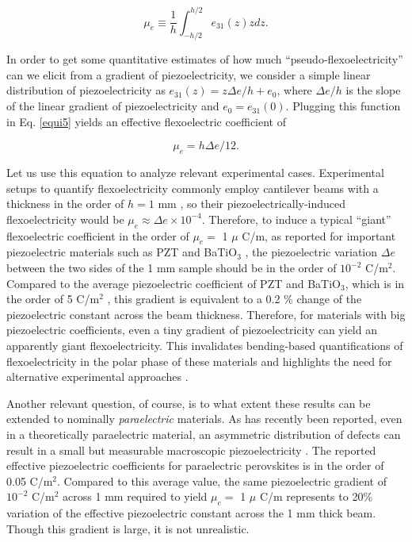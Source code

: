 \documentclass[%
 aps,prl,showpacs,
 amsmath,amssymb,
 reprint,%
]{revtex4-1}
\begin{document}
\begin{equation}
\mu_e \equiv  \frac{1}{h} \int_{-h/2}^{h/2} {e}_{31}(z) z dz. \label{equi5}
\end{equation}

In order to get some quantitative estimates of how much “pseudo-flexoelectricity” can we elicit from a gradient of piezoelectricity, we consider a simple linear distribution of piezoelectricity as
$e_{31}(z) = z {\Delta e} /h + e_0$, where $\Delta e/h$ is the slope of the linear gradient of piezoelectricity and $e_0=e_{31}(0)$. Plugging this function 
in Eq. \eqref{equi5} yields an effective flexoelectric coefficient of

\begin{equation}
\mu_e = h \Delta e/12. \label{equi6}
\end{equation}

Let us use this equation to analyze relevant experimental cases. Experimental setups to quantify flexoelectricity commonly employ cantilever beams
with a thickness in the order of $h = 1$ mm \cite{ref:Ma2001,ref:Ma2002,ref:Ma2005,ref:Ma2006,ref:Cross2006,ref:Shu2013}, so their piezoelectrically-induced flexoelectricity would be $\mu_e \approx \Delta e\times10^{-4}$. Therefore, to induce a typical ``giant'' flexoelectric coefficient in the order of
$\mu_e =$ 1 $\mu$ C/m, as reported for important piezoelectric materials such as PZT and BaTiO$_3$ \cite{ref:Ma2005,ref:Cross2006,ref:Ma2006}, the piezoelectric variation $\Delta e$ between the two sides of the 1 mm sample 
should be in the order of $10^{-2}$ C/m$^2$. Compared to the average piezoelectric coefficient of PZT and BaTiO$_3$, which
is in the order of 5 C/m$^2$ \cite{ref:Li1991,ref:Zhu1998b}, this gradient is equivalent to a 0.2 \% change of the piezoelectric constant across the beam thickness. 
Therefore, for materials with big piezoelectric coefficients, 
even a tiny gradient of piezoelectricity can yield an apparently giant flexoelectricity. 
This invalidates bending-based quantifications of flexoelectricity in the polar phase of these materials and highlights 
the need for alternative experimental approaches \cite{Cordero2017}.


Another relevant question, of course, is to what extent these results can be extended to nominally 
\textit{paraelectric} materials. As has recently been reported, even in a theoretically paraelectric material, an asymmetric distribution of defects can result in a small but measurable macroscopic piezoelectricity \cite{ref:Biancoli2015}. The reported effective piezoelectric coefficients for paraelectric perovskites is in the order of 0.05 C/m$^2$.
Compared to this average value, the same piezoelectric gradient of $10^{-2}$ C/m$^2$ across 1 mm required to yield $\mu_e =$ 1 $\mu$ C/m  represents to 20\% variation of the effective piezoelectric constant across the 1 mm thick beam. Though this gradient is large, it is not unrealistic. 
\end{document}
